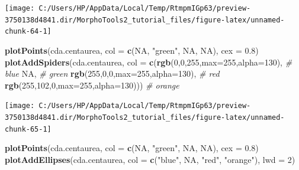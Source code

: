 \documentclass[
]{article}
\newenvironment{Shaded}{\begin{snugshade}}{\end{snugshade}}
\newcommand{\CommentTok}[1]{\textcolor[rgb]{0.56,0.35,0.01}{\textit{#1}}}
\newcommand{\DataTypeTok}[1]{\textcolor[rgb]{0.13,0.29,0.53}{#1}}
\newcommand{\DecValTok}[1]{\textcolor[rgb]{0.00,0.00,0.81}{#1}}
\newcommand{\FloatTok}[1]{\textcolor[rgb]{0.00,0.00,0.81}{#1}}
\newcommand{\KeywordTok}[1]{\textcolor[rgb]{0.13,0.29,0.53}{\textbf{#1}}}
\newcommand{\NormalTok}[1]{#1}
\newcommand{\OtherTok}[1]{\textcolor[rgb]{0.56,0.35,0.01}{#1}}
\newcommand{\StringTok}[1]{\textcolor[rgb]{0.31,0.60,0.02}{#1}}
\begin{document}
\begin{center}\texttt{[image: C:/Users/HP/AppData/Local/Temp/RtmpmIGp63/preview-3750138d4841.dir/MorphoTools2\_tutorial\_files/figure-latex/unnamed-chunk-64-1]} \end{center}

\begin{Shaded}
\begin{Highlighting}[]
\KeywordTok{plotPoints}\NormalTok{(cda.centaurea, }\DataTypeTok{col =} \KeywordTok{c}\NormalTok{(}\OtherTok{NA}\NormalTok{, }\StringTok{"green"}\NormalTok{, }\OtherTok{NA}\NormalTok{, }\OtherTok{NA}\NormalTok{), }\DataTypeTok{cex =} \FloatTok{0.8}\NormalTok{)}
\KeywordTok{plotAddSpiders}\NormalTok{(cda.centaurea, }\DataTypeTok{col =} \KeywordTok{c}\NormalTok{(}\KeywordTok{rgb}\NormalTok{(}\DecValTok{0}\NormalTok{,}\DecValTok{0}\NormalTok{,}\DecValTok{255}\NormalTok{,}\DataTypeTok{max=}\DecValTok{255}\NormalTok{,}\DataTypeTok{alpha=}\DecValTok{130}\NormalTok{), }\CommentTok{# blue}
                                      \OtherTok{NA}\NormalTok{, }\CommentTok{# green}
                                      \KeywordTok{rgb}\NormalTok{(}\DecValTok{255}\NormalTok{,}\DecValTok{0}\NormalTok{,}\DecValTok{0}\NormalTok{,}\DataTypeTok{max=}\DecValTok{255}\NormalTok{,}\DataTypeTok{alpha=}\DecValTok{130}\NormalTok{), }\CommentTok{# red}
                                      \KeywordTok{rgb}\NormalTok{(}\DecValTok{255}\NormalTok{,}\DecValTok{102}\NormalTok{,}\DecValTok{0}\NormalTok{,}\DataTypeTok{max=}\DecValTok{255}\NormalTok{,}\DataTypeTok{alpha=}\DecValTok{130}\NormalTok{))) }\CommentTok{# orange}
\end{Highlighting}
\end{Shaded}

\begin{center}\texttt{[image: C:/Users/HP/AppData/Local/Temp/RtmpmIGp63/preview-3750138d4841.dir/MorphoTools2\_tutorial\_files/figure-latex/unnamed-chunk-65-1]} \end{center}

\begin{Shaded}
\begin{Highlighting}[]
\KeywordTok{plotPoints}\NormalTok{(cda.centaurea, }\DataTypeTok{col =} \KeywordTok{c}\NormalTok{(}\OtherTok{NA}\NormalTok{, }\StringTok{"green"}\NormalTok{, }\OtherTok{NA}\NormalTok{, }\OtherTok{NA}\NormalTok{), }\DataTypeTok{cex =} \FloatTok{0.8}\NormalTok{)}
\KeywordTok{plotAddEllipses}\NormalTok{(cda.centaurea, }\DataTypeTok{col =} \KeywordTok{c}\NormalTok{(}\StringTok{"blue"}\NormalTok{, }\OtherTok{NA}\NormalTok{, }\StringTok{"red"}\NormalTok{, }\StringTok{"orange"}\NormalTok{), }\DataTypeTok{lwd =} \DecValTok{2}\NormalTok{)}
\end{Highlighting}
\end{Shaded}
\end{document}
